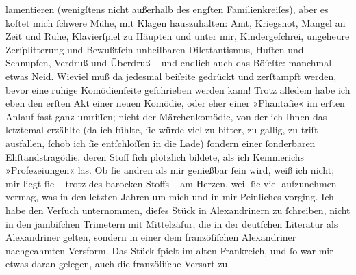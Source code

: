 \begin{ledgroupsized}[t]{13cm}
               lamentieren (wenigſtens nicht außerhalb des engſten Familienkreiſes), aber es koſtet
               mich ſchwere Mühe, mit Klagen hauszuhalten: Amt, Kriegs{\pb}not, Mangel an Zeit und Ruhe, Klavierſpiel zu Häupten und unter mir,
               Kindergeſchrei, ungeheure Zerſplitterung und Bewußtſein unheilbaren Dilettantismus,
               Huſten und Schnupfen, Verdruß und Überdruß – und endlich auch das Böſeſte: manchmal
               etwas Neid. Wieviel muß da jedesmal beiſeite gedrückt und zerſtampft werden, bevor
               eine ruhige Komödienſeite geſchrieben werden kann!\pend
           \pstart
           Trotz alledem habe ich eben den erſten Akt einer neuen Komödie, oder eher einer
               »Phantaſie« im erſten Anlauf fast ganz umriſſen; nicht der Märchenkomödie, von der ich Ihnen das
               letztemal erzählte (da ich fühlte, ſie würde viel zu bitter, zu gallig, zu triſt
               ausfallen, ſchob ich ſie entſchloſſen in die Lade) ſondern einer ſonderbaren Ehſtandstragödie, deren Stoff
               ſich plötzlich bildete, als ich Kemmerichs
                  »Profezeiungen« las. Ob ſie andren als mir
               genießbar ſein wird, weiß ich nicht; mir liegt ſie – trotz des ba{\pb}rocken Stoffs – am Herzen, weil ſie viel aufzunehmen
               vermag, was in den letzten Jahren um mich und in mir Peinliches vorging.\pend
           \pstart
           Ich habe den Verſuch unternommen, dieſes Stück in Alexandrinern zu ſchreiben, nicht
               in den jambiſchen Trimetern mit Mittelzäſur, die in der deutſchen Literatur als
               Alexandriner gelten, sondern in einer dem franzöſiſchen Alexandriner nachgeahmten Versform. Das Stück ſpielt im alten
                  Frankreich, und ſo war mir etwas daran
               gelegen, auch die franzöſiſche Versart zu

\end{ledgroupsized}
